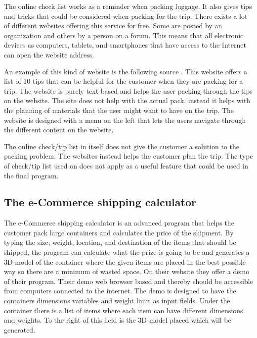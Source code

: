 The online check list works as a reminder when packing luggage. It also gives tips and tricks that could be considered when packing for the trip. There exists a lot of different websites offering this service for free. Some are posted by an organization and others by a person on a forum. This means that all electronic devices as computers, tablets, and smartphones that have access to the Internet can open the website address.

An example of this kind of website is the following source \citep{onlinecheck}. This website offers a list of 10 tips that can be helpful for the customer when they are packing for a trip. The website is purely text based and helps the user packing through the tips on the website.
The site does not help with the actual pack, instead it helps with the planning of materials that the user might want to have on the trip.
The website is designed with a menu on the left that lets the users navigate through the different content on the website.

The online check/tip list in itself does not give the customer a solution to the packing problem. The websites instead helps the customer plan the trip. The type of check/tip list used on \citep{onlinecheck} does not apply as a useful feature that could be used in the final program. %

\subsection{The e-Commerce shipping calculator}

The e-Commerce shipping calculator is an advanced program that helps the customer pack large containers and calculates the price of the shipment.
By typing the size, weight, location, and destination of the items that should be shipped, the program can calculate what the prize is going to be and generates a 3D-model of the container where the given items are placed in the best possible way so there are a minimum of wasted space. On their website \citep{solvingmaze} they offer a demo of their program. Their demo web browser based and thereby should be accessible from computers connected to the internet.
The demo is designed to have the containers dimensions variables and weight limit as input fields. Under the container there is a list of items where each item can have different dimensions and weights. To the right of this field is the 3D-model placed which will be generated.

